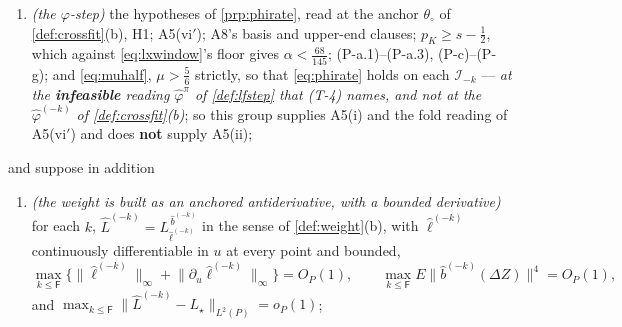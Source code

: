 \begin{theorem}
\begin{enumerate}
{own hypothesis line rather than in a remark};
\item[(T-5)] \emph{(the $\varphi$-step)} the hypotheses of \cref{prp:phirate}, read at the anchor
$\theta_\circ$ of \cref{def:crossfit}(b), H1; A5(vi$'$); A8's basis and upper-end clauses;
$p_K\ge s-\tfrac12$, which against \eqref{eq:lxwindow}'s floor gives $\alpha<\tfrac{68}{145}$; (P-a.1)--(P-a.3), (P-c)--(P-g); and
\eqref{eq:muhalf}, $\mu>\tfrac56$ strictly,
so that \eqref{eq:phirate} holds on each $\mathcal I_{-k}$ --- \emph{at the \textbf{infeasible} reading
$\hat\varphi^{\pi}$ of \cref{def:lfstep} that \textup{(T-4)} names, and not at the
$\hat\varphi^{(-k)}$ of \cref{def:crossfit}\textup{(b)}}; so this group supplies A5(i) and the fold
reading of A5(vi$'$) and does \textbf{not} supply A5(ii);
\end{enumerate}
and suppose in addition
\begin{enumerate}
\item[(R-a)] \emph{(the weight is built as an anchored antiderivative, with a bounded derivative)} for each
$k$, $\hat L^{(-k)}=L^{\,\hat b^{(-k)}}_{\hat\ell^{(-k)}}$ in the sense of \cref{def:weight}(b), with
$\hat\ell^{(-k)}$ continuously differentiable in $u$ at every point and bounded,
\[
\max_{k\le\mathsf F}\Big\{\big\|\hat\ell^{(-k)}\big\|_\infty+\big\|\partial_u\hat\ell^{(-k)}\big\|_\infty\Big\}=O_P(1),
\qquad
\max_{k\le\mathsf F}E\big\|\hat b^{(-k)}(\Delta Z)\big\|^{4}=O_P(1),
\]
and $\max_{k\le\mathsf F}\|\hat L^{(-k)}-L_\star\|_{L^{2}(P)}=o_P(1)$;

\end{enumerate}
\end{theorem}
